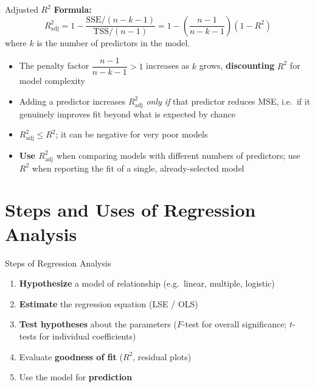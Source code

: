 \documentclass[12pt, aspectratio=169]{beamer}
\begin{document}
    \begin{frame}{Adjusted $R^2$}
        \textbf{Formula:}
        \[
            R^2_{\text{adj}}
            = 1 - \frac{\text{SSE}/(n - k - 1)}{\text{TSS}/(n - 1)}
            = 1 - \left(\frac{n-1}{n-k-1}\right)(1 - R^2)
        \]
        where $k$ is the number of predictors in the model.

        \vspace{0.5em}

        \begin{itemize}
            \item The penalty factor $\dfrac{n-1}{n-k-1} > 1$ increases as $k$ grows, \textbf{discounting} $R^2$ for model complexity
            \item Adding a predictor increases $R^2_{\text{adj}}$ \emph{only if} that predictor reduces MSE, i.e.\ if it genuinely improves fit beyond what is expected by chance
            \item $R^2_{\text{adj}} \leqslant R^2$; it can be negative for very poor models
            \item \textbf{Use $R^2_{\text{adj}}$} when comparing models with different numbers of predictors; use $R^2$ when reporting the fit of a single, already-selected model
        \end{itemize}
    \end{frame}


    \section{Steps and Uses of Regression Analysis}

    \begin{frame}{Steps of Regression Analysis}
        \begin{enumerate}
            \item \textbf{Hypothesize} a model of relationship (e.g.\ linear, multiple, logistic)
            \item \textbf{Estimate} the regression equation (LSE / OLS)
            \item \textbf{Test hypotheses} about the parameters ($F$-test for overall significance; $t$-tests for individual coefficients)
            \item Evaluate \textbf{goodness of fit} ($R^2$, residual plots)
            \item Use the model for \textbf{prediction}
        \end{enumerate}
    \end{frame}
\end{document}
